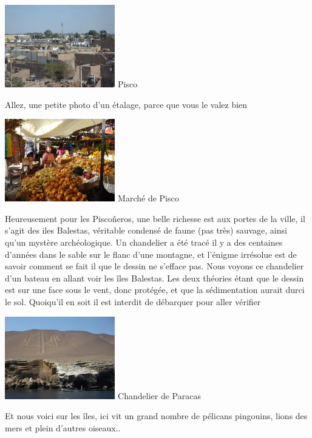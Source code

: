 \begin{multicols}{2}
\hspace*{-0.65cm}
\includegraphics[width=4.8cm]{articles/Cote-du-sud/12559974777RC0.jpg}
Pisco


Allez, une petite photo d'un étalage, parce que vous le valez bien

\hspace*{-0.65cm}
\includegraphics[width=4.8cm]{articles/Cote-du-sud/1255997490cIfD.jpg}
Marché de Pisco


Heureusement pour les Piscoñeros, une belle richesse est aux portes de la ville, il s'agit des iles Balestas, véritable condensé de faune (pas très) sauvage, ainsi qu'un mystère archéologique. Un chandelier a été tracé il y a des centaines d'années dans le sable sur le flanc d'une montagne, et l'énigme irrésolue est de savoir comment se fait il que le dessin ne s'efface pas. Nous voyons ce chandelier d'un bateau en allant voir les îles Balestas. Les deux théories étant que le dessin est sur une face sous le vent, donc protégée, et que la sédimentation aurait durci le sol. Quoiqu'il en soit il est interdit de débarquer pour aller vérifier

\hspace*{-0.65cm}
\includegraphics[width=4.8cm]{articles/Cote-du-sud/1255997496rIn7.jpg}
Chandelier de Paracas


Et nous voici sur les îles, ici vit un grand nombre de pélicans pingouins, lions des mers et plein d'autres oiseaux..


\end{multicols}
